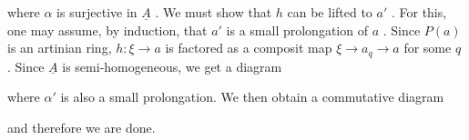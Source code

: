 \begin{center}
\end{center}
where  $\alpha$  is surjective in  $\underline{A}$  . We must show that  $h$  can be lifted to  $a'$  . For this, one may assume, by induction, that  $a'$  is a small prolongation of  $a$  . Since  $P(a)$  is an artinian ring,  $h : \xi \to a$  is factored as a composit map $\xi \to a_q \longrightarrow a$  for some  $q$  . Since  $\underline{A}$  is semi-homogeneous, we get a diagram

\begin{center}
\end{center}
where  $\alpha'$  is also a small prolongation. We then obtain a commutative diagram

\begin{center}
\end{center}
and therefore we are done.

